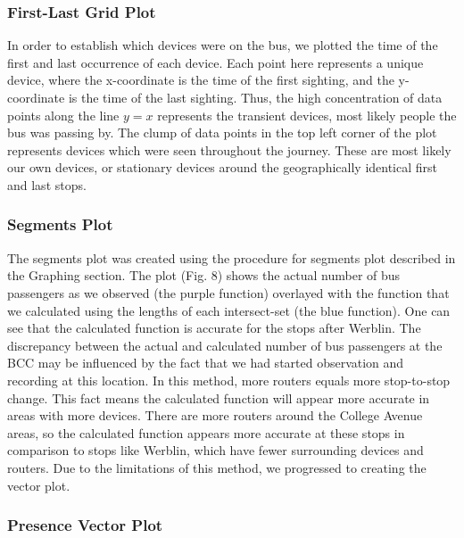 \FloatBarrier

\subsubsection*{First-Last Grid Plot}

In order to establish which devices were on the bus, we plotted the time of the first and last occurrence of each device.
Each point here represents a unique device, where the x-coordinate is the time of the first sighting, and the y-coordinate is the time of the last sighting.
Thus, the high concentration of data points along the line \(y=x\) represents the transient devices, most likely people the bus was passing by.
The clump of data points in the top left corner of the plot represents devices which were seen throughout the journey.
These are most likely our own devices, or stationary devices around the geographically identical first and last stops.

\subsubsection*{Segments Plot}
The segments plot was created using the procedure for segments plot described in the Graphing section. The plot (Fig. 8) shows the actual number of bus passengers as we observed (the purple function) overlayed
with the function that we calculated using the lengths of each intersect-set (the blue function). One can see that the calculated function is accurate for the stops after Werblin.
The discrepancy between the actual and calculated number of bus passengers at the BCC may be influenced by the fact that we had started observation and recording at this location. In this method, more routers
equals more stop-to-stop change. This fact means the calculated function will appear more accurate in areas with more devices. There are more routers around the College Avenue areas, so the calculated function
appears more accurate at these stops in comparison to stops like Werblin, which have fewer surrounding devices and routers. Due to the limitations of this method, we progressed to creating the vector plot.

\subsubsection*{Presence Vector Plot}

